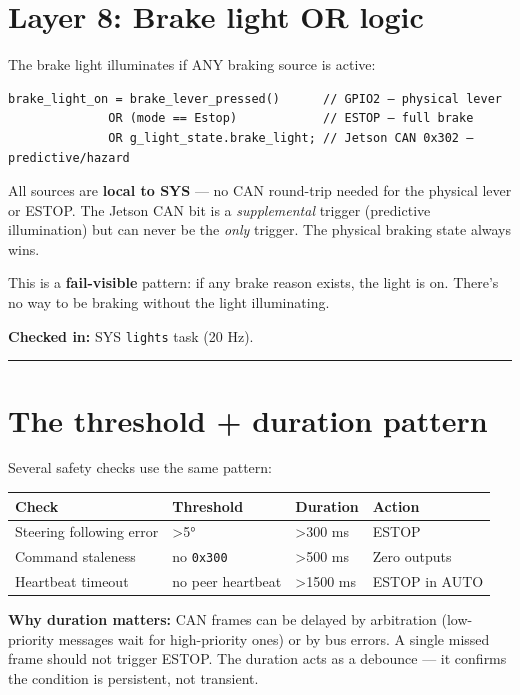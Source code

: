 \documentclass[12pt,a4paper,oneside]{report}
\begin{document}
\section{Layer 8: Brake light OR logic}\label{layer-8-brake-light-or-logic}

The brake light illuminates if ANY braking source is active:

\begin{verbatim}
brake_light_on = brake_lever_pressed()      // GPIO2 — physical lever
              OR (mode == Estop)            // ESTOP — full brake
              OR g_light_state.brake_light; // Jetson CAN 0x302 — predictive/hazard
\end{verbatim}

All sources are \textbf{local to SYS} --- no CAN round-trip needed for the
physical lever or ESTOP. The Jetson CAN bit is a \emph{supplemental} trigger
(predictive illumination) but can never be the \emph{only} trigger. The physical
braking state always wins.

This is a \textbf{fail-visible} pattern: if any brake reason exists, the light
is on. There's no way to be braking without the light illuminating.

\textbf{Checked in:} SYS \texttt{lights} task (20 Hz).

\begin{center}\rule{0.5\linewidth}{0.5pt}\end{center}

\section{The threshold + duration pattern}\label{the-threshold-duration-pattern}

Several safety checks use the same pattern:

\begin{longtable}[]{@{}llll@{}}
\toprule\noalign{}
Check & Threshold & Duration & Action \\
\midrule\noalign{}
\endhead
\bottomrule\noalign{}
\endlastfoot
Steering following error & \textgreater5° & \textgreater300 ms & ESTOP \\
Command staleness & no \texttt{0x300} & \textgreater500 ms & Zero outputs \\
Heartbeat timeout & no peer heartbeat & \textgreater1500 ms & ESTOP in AUTO \\
\end{longtable}

\textbf{Why duration matters:} CAN frames can be delayed by arbitration
(low-priority messages wait for high-priority ones) or by bus errors. A single
missed frame should not trigger ESTOP. The duration acts as a debounce --- it
confirms the condition is persistent, not transient.
\end{document}
